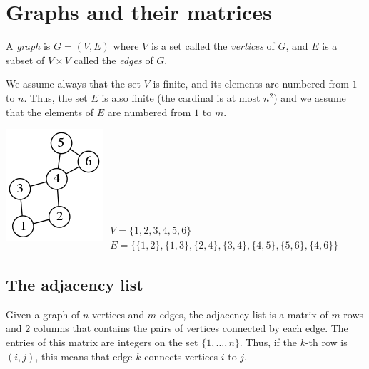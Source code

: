\section{Graphs and their matrices}


A \emph{graph} is $G=(V,E)$ where $V$ is a set called the
\emph{vertices} of $G$, and $E$ is a subset of $V\times V$ called the
\emph{edges} of $G$.



We assume always that the set $V$ is finite, and its elements are numbered
from $1$ to $n$.  Thus, the set $E$ is also finite (the cardinal is at most
$n^2$) and we assume that the elements of $E$ are numbered from $1$ to $m$.


\includegraphics{graph1.png}
$\displaystyle\begin{matrix}
	V   = \{1,2,3,4,5,6\} \\
	E   =  \{ \{1,2\},\{1,3\},\{2,4\},\{3,4\},\{4,5\},\{5,6\},\{4,6\} \}
\end{matrix}$


\subsection{The adjacency list}


Given a graph of $n$ vertices and $m$ edges,
the adjacency list is a matrix
of $m$ rows and $2$ columns that contains the pairs of vertices connected by
each edge.  The entries of this matrix are integers on the set
$\{1,\ldots,n\}$. Thus, if the $k$-th row is $(i,j)$, this means that edge
$k$ connects vertices $i$ to $j$.

